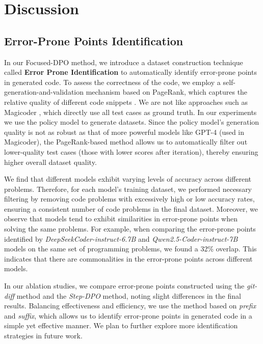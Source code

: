 \section{Discussion}
\label{sec:discussion}

\subsection{Error-Prone Points Identification}


In our Focused-DPO method, we introduce a dataset construction technique called \textbf{Error Prone Identification} to automatically identify error-prone points in generated code. To assess the correctness of the code, we employ a self-generation-and-validation mechanism based on PageRank, which captures the relative quality of different code snippets \cite{codedpo}. We are not like approaches such as Magicoder \cite{wei2023magicoder}, which directly use all test cases as ground truth. In our experiments we use the policy model to generate datasets. Since the policy model's generation quality is not as robust as that of more powerful models like GPT-4 (used in Magicoder), the PageRank-based method allows us to automatically filter out lower-quality test cases (those with lower scores after iteration), thereby ensuring higher overall dataset quality.

We find that different models exhibit varying levels of accuracy across different problems. Therefore, for each model's training dataset, we performed necessary filtering by removing code problems with excessively high or low accuracy rates, ensuring a consistent number of code problems in the final dataset. Moreover, we observe that models tend to exhibit similarities in error-prone points when solving the same problems. For example, when comparing the error-prone points identified by \textit{DeepSeekCoder-instruct-6.7B} and \textit{Qwen2.5-Coder-instruct-7B} models on the same set of programming problems, we found a 32\% overlap. This indicates that there are commonalities in the error-prone points across different models.

In our ablation studies, we compare error-prone points constructed using the \textit{git-diff} method and the \textit{Step-DPO} method, noting slight differences in the final results. 
Balancing effectiveness and efficiency, we use the method based on \textit{prefix} and \textit{suffix}, which allows us to identify error-prone points in generated code in a simple yet effective manner. We plan to further explore more identification strategies in future work.

